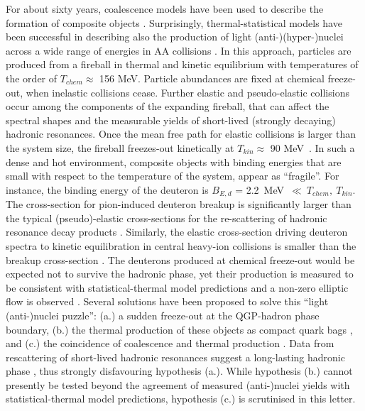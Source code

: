 For about sixty years, coalescence models have been used to describe the formation of composite objects \cite{Butler:1963, Kapusta:1980, Sato:1981ez, Nagle:1996vp, Scheibl:1998tk, Cho:2017dcy, Blum:2017qnn, Bazak:2018hgl, Zhao:2018lyf}.
Surprisingly, thermal-statistical models have been successful in describing also the production of light \mbox{(anti-)}(hyper-)nuclei across a wide range of energies in AA collisions \cite{Andronic:2010qu,Andronic:2017}. 
In this approach, particles are produced from a fireball in thermal and kinetic equilibrium with temperatures of the order of $T_{chem} \approx$ 156 MeV.
Particle abundances are fixed at chemical freeze-out, when inelastic collisions cease. Further elastic and pseudo-elastic collisions occur among the components of the expanding fireball, that can affect the spectral shapes and the measurable yields of short-lived (strongly decaying) hadronic resonances. Once the mean free path for elastic collisions is larger than the system size, the fireball freezes-out kinetically at $T_{kin} \approx$ 90 MeV~\cite{Abelev:2013vea}. 
In such a dense and hot environment, composite objects with binding energies that are small with respect to the temperature of the system, appear as ``fragile''. 
For instance, the binding energy of the deuteron is $B_{E, d}$ = 2.2~MeV~$\ll~T_{chem},~T_{kin}$.
The cross-section for pion-induced deuteron breakup is significantly larger than the typical (pseudo)-elastic cross-sections for the re-scattering of hadronic resonance decay products \cite{Garcilazo:1982yc, Bass:1998ca, Schukraft:2017nbn}. 
Similarly, the elastic cross-section driving deuteron spectra to kinetic equilibration in central heavy-ion collisions \cite{Acharya:2017dmc} is smaller than the breakup cross-section \cite{Garcilazo:1982yc, Bass:1998ca, Schukraft:2017nbn}.   
The deuterons produced at chemical freeze-out would be expected not to survive the hadronic phase, yet their production is measured to be consistent with statistical-thermal model predictions and a non-zero elliptic flow is observed \cite{Acharya:2017dmc}. 
Several solutions have been proposed to solve this ``light (anti-)nuclei puzzle'': (a.) a sudden freeze-out at the QGP-hadron phase boundary, (b.) the thermal production of these objects as compact quark bags \cite{Andronic:2017}, and (c.) the coincidence of coalescence and thermal production \cite{Scheibl:1998tk, HeinzTorino}. 
Data from rescattering of short-lived hadronic resonances suggest a long-lasting hadronic phase \cite{Abelev:2014uua}, thus strongly disfavouring hypothesis (a.). 
While hypothesis (b.) cannot presently be tested beyond the agreement of measured (anti-)nuclei yields with statistical-thermal model predictions, hypothesis (c.) is scrutinised in this letter.
